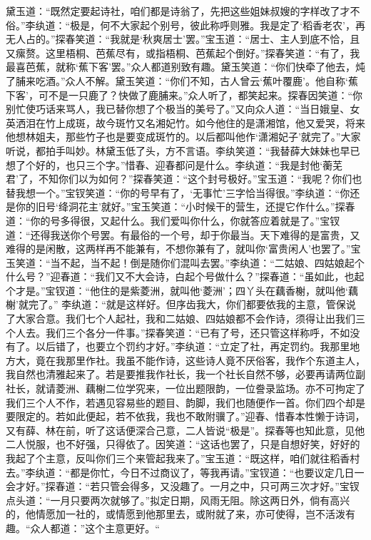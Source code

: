 \documentclass[12pt,oneside]{book}
\begin{document}
黛玉道：“既然定要起诗社，咱们都是诗翁了，先把这些姐妹叔嫂的字样改了才不俗。”李纨道：“极是，何不大家起个别号，彼此称呼则雅。我是定了‘稻香老农’，再无人占的。”探春笑道：“我就是‘秋爽居士’罢。”宝玉道：“居士、主人到底不恰，且又瘰赘。这里梧桐、芭蕉尽有，或指梧桐、芭蕉起个倒好。”探春笑道：“有了，我最喜芭蕉，就称‘蕉下客’罢。”众人都道别致有趣。黛玉笑道：“你们快牵了他去，炖了脯来吃酒。”众人不解。黛玉笑道：“你们不知，古人曾云‘蕉叶覆鹿’。他自称‘蕉下客’，可不是一只鹿了？快做了鹿脯来。”众人听了，都笑起来。探春因笑道：“你别忙使巧话来骂人，我已替你想了个极当的美号了。”又向众人道：“当日娥皇、女英洒泪在竹上成斑，故今斑竹又名湘妃竹。如今他住的是潇湘馆，他又爱哭，将来他想林姐夫，那些竹子也是要变成斑竹的。以后都叫他作‘潇湘妃子’就完了。”大家听说，都拍手叫妙。林黛玉低了头，方不言语。李纨笑道：“我替薛大妹妹也早已想了个好的，也只三个字。”惜春、迎春都问是什么。李纨道：“我是封他‘蘅芜君’了，不知你们以为如何？”探春笑道：“这个封号极好。”宝玉道：“我呢？你们也替我想一个。”宝钗笑道：“你的号早有了，‘无事忙’三字恰当得很。”李纨道：“你还是你的旧号‘绛洞花主’就好。”宝玉笑道：“小时候干的营生，还提它作什么。”探春道：“你的号多得很，又起什么。我们爱叫你什么，你就答应着就是了。”宝钗道：“还得我送你个号罢。有最俗的一个号，却于你最当。天下难得的是富贵，又难得的是闲散，这两样再不能兼有，不想你兼有了，就叫你‘富贵闲人’也罢了。”宝玉笑道：“当不起，当不起！倒是随你们混叫去罢。”李纨道：“二姑娘、四姑娘起个什么号？”迎春道：“我们又不大会诗，白起个号做什么？”探春道：“虽如此，也起个才是。”宝钗道：“他住的是紫菱洲，就叫他‘菱洲’；四丫头在藕香榭，就叫他‘藕榭’就完了。”
李纨道：“就是这样好。但序齿我大，你们都要依我的主意，管保说了大家合意。我们七个人起社，我和二姑娘、四姑娘都不会作诗，须得让出我们三个人去。我们三个各分一件事。”探春笑道：“已有了号，还只管这样称呼，不如没有了。以后错了，也要立个罚约才好。”李纨道：“立定了社，再定罚约。我那里地方大，竟在我那里作社。我虽不能作诗，这些诗人竟不厌俗客，我作个东道主人，我自然也清雅起来了。若是要推我作社长，我一个社长自然不够，必要再请两位副社长，就请菱洲、藕榭二位学究来，一位出题限韵，一位誊录监场。亦不可拘定了我们三个人不作，若遇见容易些的题目、韵脚，我们也随便作一首。你们四个却是要限定的。若如此便起，若不依我，我也不敢附骥了。”迎春、惜春本性懒于诗词，又有薛、林在前，听了这话便深合己意，二人皆说“极是”。探春等也知此意，见他二人悦服，也不好强，只得依了。因笑道：“这话也罢了，只是自想好笑，好好的我起了个主意，反叫你们三个来管起我来了。”宝玉道：“既这样，咱们就往稻香村去。”李纨道：“都是你忙，今日不过商议了，等我再请。”宝钗道：“也要议定几日一会才好。”探春道：“若只管会得多，又没趣了。一月之中，只可两三次才好。”宝钗点头道：“一月只要两次就够了。”拟定日期，风雨无阻。除这两日外，倘有高兴的，他情愿加一社的，或情愿到他那里去，或附就了来，亦可使得，岂不活泼有趣。“众人都道：”这个主意更好。“
\end{document}
